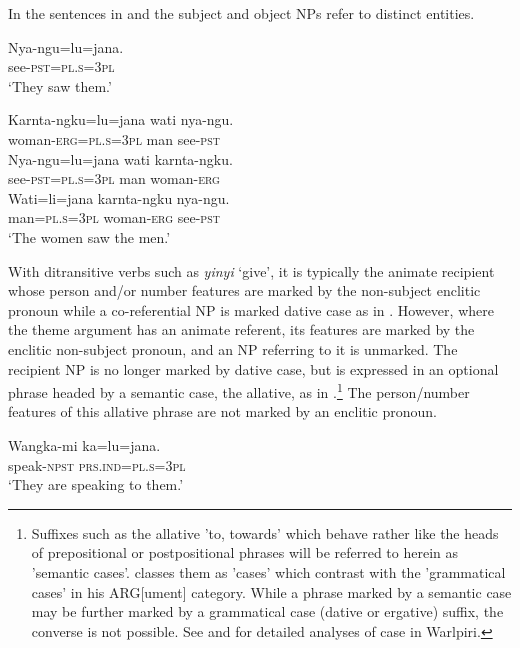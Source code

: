 \documentclass[output=paper]{../langscibook}
\begin{document}
In the sentences in  and  the subject and object NPs refer to distinct entities.

\ea%
    \label{ex:laughren:2}

\ea
\label{ex:laughren:2a}
\gll Nya-ngu=lu=jana.\\
    see-\textsc{pst=pl.s=3pl}\\
\glt `They saw them.’

\ex
\label{ex:laughren:2b}
\gll Karnta-ngku=lu=jana  wati  nya-ngu.\\
    woman-\textsc{erg=pl.s=3pl}  man  see-\textsc{pst}\\

\ex
\label{ex:laughren:2c}
\gll Nya-ngu=lu=jana  wati  karnta-ngku.\\
    see-\textsc{pst=pl.s=3pl}  man  woman-\textsc{erg}\\

\ex
\label{ex:laughren:2d}
\gll Wati=li=jana  karnta-ngku  nya-ngu.\\
 man=\textsc{pl.s=3pl}  woman-\textsc{erg}  see-\textsc{pst}\\
\glt `The women saw the men.'
\z
\z

With ditransitive verbs such as \textit{yinyi} `give', it is typically the animate recipient whose person and/or number features are marked by the non-subject enclitic pronoun while a co-referential NP is marked dative case as in . However, where the theme argument has an animate referent, its features are marked by the enclitic non-subject pronoun, and an NP referring to it is unmarked. The recipient NP is no longer marked by dative case, but is expressed in an optional phrase headed by a semantic case, the allative, as in .\footnote{Suffixes such as the allative 'to, towards' which behave rather like the heads of prepositional or postpositional phrases will be referred to herein as 'semantic cases'. \citet{Nash1986} classes them as 'cases' which contrast with the 'grammatical cases' in his ARG[ument] category. While a phrase marked by a semantic case may be further marked by a grammatical case (dative or ergative) suffix, the converse is not possible. See \citet{Simpson1991} and \citet{Legate2008} for detailed analyses of case in Warlpiri.} The person/number features of this allative phrase are not marked by an enclitic pronoun.

\ea%
    \label{ex:laughren:3}

\ea
\label{ex:laughren:3a}
\gll Wangka-mi  ka=lu=jana.   \\
    speak-\textsc{npst}  \textsc{prs.ind=pl.s=3pl}\\
\glt `They are speaking to them.'
\end{document}

